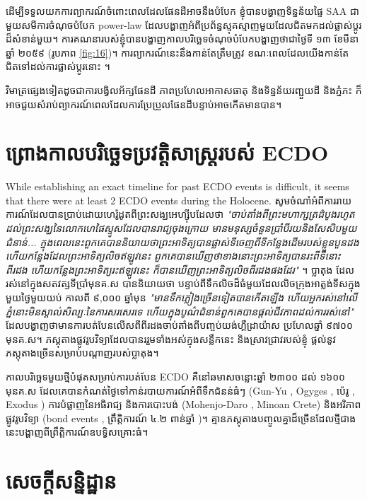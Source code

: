 \documentclass[10pt,twocolumn,letterpaper]{article}
\begin{document}
ដើម្បីទទួលយកការព្យាករណ៍ចំពោះពេលដែលផែនដីអាចនឹងបំបែក ខ្ញុំបានបង្ហាញទិន្នន័យផ្ទៃ SAA ជាមួយសមីការចំណុចបំបែក power-law ដែលបង្ហាញអំពីប្រព័ន្ធស្មុគស្មាញមួយដែលជិតមកដល់ផ្លាស់ប្ដូរដ៏សំខាន់មួយ។ ការគណនារបស់ខ្ញុំបានបង្ហាញកាលបរិច្ឆេទចំណុចបំបែកបង្ហាញថាជាថ្ងៃទី ១៣ ខែមីនា ឆ្នាំ ២០៥៩ (រូបភាព \ref{fig:16})។ ការព្យាករណ៍នេះនឹងកាន់តែត្រឹមត្រូវ ខណៈពេលដែលយើងកាន់តែជិតទៅដល់ការផ្លាស់ប្ដូរនោះ \cite{136}។

វិមាត្រផ្សេងទៀតដូចជាការបង្វិលអ័ក្សផែនដី ភាពប្រហែលអាកាសធាតុ និងទិន្នន័យរញ្ជួយដី និងភ្នំភះ ក៏អាចជួយសំរាប់ព្យាករណ៍ពេលដែលការប្រែប្រួលផែនដីបន្ទាប់អាចកើតមានបាន។

\section{ព្រោងកាលបរិច្ឆេទប្រវត្តិសាស្ត្ររបស់ ECDO}
While establishing an exact timeline for past ECDO events is difficult, it seems that there were at least 2 ECDO events during the Holocene. សូមចំណាំអំពីការរាយការណ៍ដែលបានប្រាប់ដោយហេរ៉ូដូតពីព្រះសង្ឃអេហ្ស៊ីបដែលថា \textit{"ចាប់តាំងពីព្រះមហាក្សត្រដំបូងរហូតដល់ព្រះសង្ឃនៃលោកហេផៃស្ទូសដែលបានរាជ្យចុងក្រោយ មានមនុស្សចំនួនប្រាំបីរយនិងសែសិបមួយជំនាន់... ក្នុងពេលនេះពួកគេបាននិយាយថាព្រះអាទិត្យបានផ្លាស់ទីចេញពីទីកន្លែងដើមរបស់ខ្លួនបួនដង ហើយកន្លែងដែលព្រះអាទិត្យលិចឥឡូវនេះ ពួកគេបានឃើញថាខាងនោះព្រះអាទិត្យបានរះពីទីនោះពីរដង ហើយកន្លែងព្រះអាទិត្យរះឥឡូវនេះ ក៏បានឃើញព្រះអាទិត្យលិចពីរដងផងដែរ"} \cite{32}។ ប្លាតុង ដែលរស់នៅក្នុងសតវត្សទីប្រាំមុនគ.ស \cite{111} បាននិយាយថា បន្ទាប់ពីទឹកលិចដ៏ធំមួយដែលលិចក្រុងអាត្លង់ទីសក្នុងមួយថ្ងៃមួយយប់ កាលពី ៩,០០០ ឆ្នាំមុន \textit{"មានទឹកភ្លៀងច្រើនទៀតបានកើតឡើង ហើយអ្នករស់នៅលើភ្នំនោះមិនស្គាល់សិល្បៈនៃការសរសេរទេ ហើយក្នុងបូណ៌ជំនាន់ពួកគេបានផ្តល់ជីវភាពដល់ការរស់នៅ"} \cite{112} ដែលបង្ហាញថាមានការបត់បែនលើសពីពីរដងចាប់តាំងពីបញ្ចប់យង់ហ្គឺដ្រាយ៉ាស ប្រហែលឆ្នាំ ៩៧០០ មុនគ.ស។ ភស្តុតាងផ្លូវរូបវិទ្យាដែលបានររួមទាំងអស់ក្នុងសន្លឹកនេះ និងស្រាវជ្រាវរបស់ខ្ញុំ \cite{2} ផ្ដល់នូវភស្តុតាងច្រើនសម្រាប់បណ្ដាញរបស់ប្លាតុង។

កាលបរិច្ឆេទមួយថ្មីបំផុតសម្រាប់ការបត់បែន ECDO គឺនៅឆមាសចន្លោះឆ្នាំ ២៣០០ ដល់ ១៦០០ មុនគ.ស ដែលគេបានកំណត់ថ្ងៃទៅកាន់របាយការណ៍អំពីទឹកជំនន់ធំៗ (Gun-Yu \cite{113,114,115}, Ogyges \cite{116,117}, ប៉េរូ \cite{118,119}, Exodus \cite{120}) ការបំផ្លាញនៃអធិរាជ្យ និងការបោះបង់ (Mohenjo-Daro \cite{121}, Minoan Crete\cite{100,101}) និងអរិភាពផ្លូវរូបវិទ្យា (bond events \cite{122}, ព្រឹត្តិការណ៍ ៤.២ ពាន់ឆ្នាំ \cite{90})។ គ្មានភស្តុតាងបញ្ចូលគ្នាដ៏ច្រើនដែលថ្មីជាងនេះបង្ហាញពីព្រឹត្តិការណ៍ឧបទ្វិសគ្រោះធំ។

\section{សេចក្តីសន្និដ្ឋាន}
\end{document}

